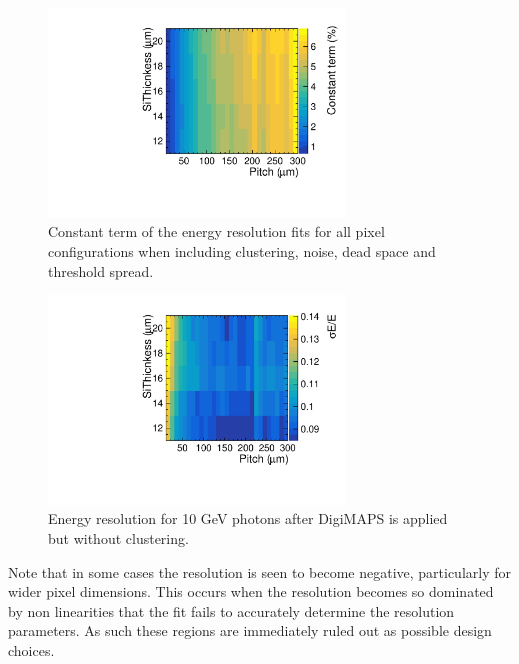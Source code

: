 \begin{figure}
  \centering
  \includegraphics[width=0.7\textwidth,keepaspectratio]{DECALStudies/fig/FullDigiConstant.pdf}
  \caption{Constant term of the energy resolution fits for all pixel configurations when including clustering, noise, dead space and threshold spread. }
  \label{fig:constanttermDigiClust}
\end{figure}

\begin{figure}
  \centering
  \includegraphics[width=0.7\textwidth,keepaspectratio]{DECALStudies/fig/NoClusterRes10.pdf}
  \caption{Energy resolution for 10 GeV photons after DigiMAPS is applied but without clustering.}
  \label{fig:resolution50DigiNoClust}
\end{figure}

Note that in some cases the resolution is seen to become negative, particularly for wider pixel dimensions. This occurs when the resolution becomes so dominated by non linearities that the fit fails to accurately determine the resolution parameters. As such these regions are immediately ruled out as possible design choices.

